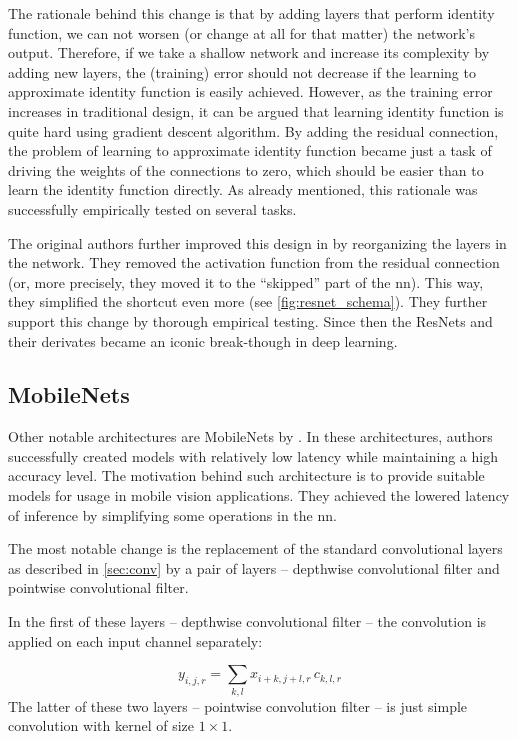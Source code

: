 The rationale behind this change is that by adding layers that perform identity function, we can not worsen (or change at all for that matter) the network's output. Therefore, if we take a shallow network and increase its complexity by adding new layers, the (training) error should not decrease if the learning to approximate identity function is easily achieved. However, as the training error increases in traditional design, it can be argued that learning identity function is quite hard using gradient descent algorithm. By adding the residual connection, the problem of learning to approximate identity function became just a task of driving the weights of the connections to zero, which should be easier than to learn the identity function directly. As already mentioned, this rationale was successfully empirically tested on several tasks.

The original authors further improved this design in \cite{resnetimp} by reorganizing the layers in the network. They removed the activation function from the residual connection (or, more precisely, they moved it to the ``skipped'' part of the \gls{nn}). This way, they simplified the shortcut even more (see \autoref{fig:resnet_schema}). They further support this change by thorough empirical testing. Since then the ResNets and their derivates became an iconic break-though in deep learning.

\subsection{MobileNets}

\label{ssec:mobilenet}

Other notable architectures are MobileNets by \cite{mobilenets}. In these architectures, authors successfully created models with relatively low latency while maintaining a high accuracy level. The motivation behind such architecture is to provide suitable models for usage in mobile vision applications. They achieved the lowered latency of inference by simplifying some operations in the \gls{nn}.

The most notable change is the replacement of the standard convolutional layers as described in \autoref{sec:conv} by a pair of layers -- depthwise convolutional filter and pointwise convolutional filter.

In the first of these layers -- depthwise convolutional filter -- the convolution is applied on each input channel separately:

$$y_{i, j, r} = \sum_{k, l} x_{i+k, j+l, r} \, c_{k, l, r}$$
The latter of these two layers -- pointwise convolution filter -- is just simple convolution with kernel of size $1 \times 1$.

